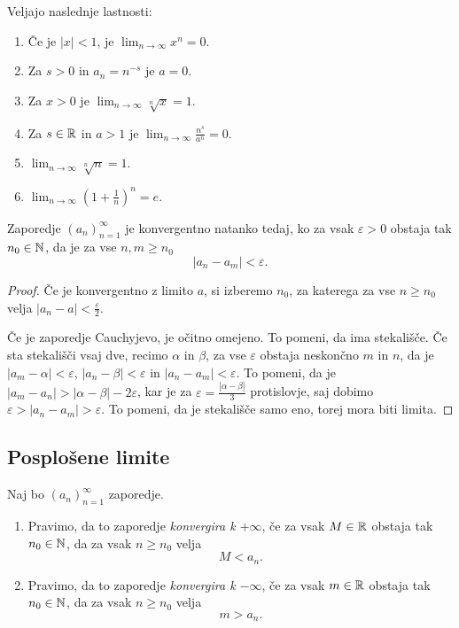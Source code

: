 \documentclass[12pt, a4paper]{article}
\begin{document}
\begin{posledica}
Veljajo naslednje lastnosti:

\begin{enumerate}[label=\roman*)]
\item Če je $|x|<1$, je $\displaystyle\lim_{n\to\infty}x^n=0$.
\item Za $s>0$ in $a_n=n^{-s}$ je $a=0$.
\item Za $x>0$ je $\displaystyle\lim_{n\to\infty}\sqrt[n]{x}=1$.
\item Za $s\in\mathbb{R}$ in $a>1$ je $\displaystyle\lim_{n\to\infty}\frac{n^s}{a^n}=0$.
\item $\displaystyle\lim_{n\to\infty}\sqrt[n]{n}=1$.
\item $\displaystyle\lim_{n\to\infty}\left(1+\frac{1}{n}\right)^n=e$.
\end{enumerate}
\end{posledica}

\begin{izrek}
Zaporedje $(a_n)_{n=1}^\infty$ je konvergentno natanko tedaj, ko za vsak $\varepsilon>0$ obstaja tak $n_0\in\mathbb{N}$, da je za vse $n,m\geq n_0$
\[
|a_n-a_m|<\varepsilon.
\]
\end{izrek}

\begin{proof}
Če je konvergentno z limito $a$, si izberemo $n_0$, za katerega za vse $n\geq n_0$ velja $|a_n-a|<\frac{\varepsilon}{2}$.

Če je zaporedje Cauchyjevo, je očitno omejeno. To pomeni, da ima stekališče. Če sta stekališči vsaj dve, recimo $\alpha$ in $\beta$, za vse $\varepsilon$ obstaja neskončno $m$ in $n$, da je $|a_m-\alpha|<\varepsilon$, $|a_n-\beta|<\varepsilon$ in $|a_n-a_m|<\varepsilon$. To pomeni, da je $|a_m-a_n|>|\alpha-\beta|-2\varepsilon$, kar je za $\varepsilon=\frac{|\alpha-\beta|}{3}$ protislovje, saj dobimo $\varepsilon>|a_n-a_m|>\varepsilon$. To pomeni, da je stekališče samo eno, torej mora biti limita.
\end{proof}

\newpage

\subsection{Posplošene limite}

\begin{definicija}
Naj bo $(a_n)_{n=1}^\infty$ zaporedje.

\begin{enumerate}[label=\roman*)]
\item Pravimo, da to zaporedje \emph{konvergira k $+\infty$}, če za vsak $M\in\mathbb{R}$ obstaja tak $n_0\in\mathbb{N}$, da za vsak $n\geq n_0$ velja
\[
M<a_n.
\]
\item Pravimo, da to zaporedje \emph{konvergira k $-\infty$}, če za vsak $m\in\mathbb{R}$ obstaja tak $n_0\in\mathbb{N}$, da za vsak $n\geq n_0$ velja
\[
m>a_n.
\]
\end{enumerate}
\end{definicija}
\end{document}
